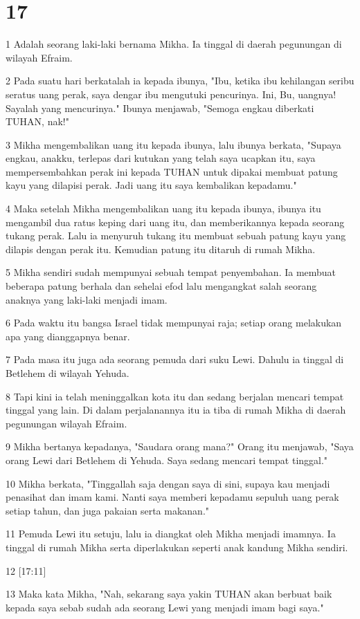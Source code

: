 \chapter{17}

\par 1 Adalah seorang laki-laki bernama Mikha. Ia tinggal di daerah pegunungan di wilayah Efraim.
\par 2 Pada suatu hari berkatalah ia kepada ibunya, "Ibu, ketika ibu kehilangan seribu seratus uang perak, saya dengar ibu mengutuki pencurinya. Ini, Bu, uangnya! Sayalah yang mencurinya." Ibunya menjawab, "Semoga engkau diberkati TUHAN, nak!"
\par 3 Mikha mengembalikan uang itu kepada ibunya, lalu ibunya berkata, "Supaya engkau, anakku, terlepas dari kutukan yang telah saya ucapkan itu, saya mempersembahkan perak ini kepada TUHAN untuk dipakai membuat patung kayu yang dilapisi perak. Jadi uang itu saya kembalikan kepadamu."
\par 4 Maka setelah Mikha mengembalikan uang itu kepada ibunya, ibunya itu mengambil dua ratus keping dari uang itu, dan memberikannya kepada seorang tukang perak. Lalu ia menyuruh tukang itu membuat sebuah patung kayu yang dilapis dengan perak itu. Kemudian patung itu ditaruh di rumah Mikha.
\par 5 Mikha sendiri sudah mempunyai sebuah tempat penyembahan. Ia membuat beberapa patung berhala dan sehelai efod lalu mengangkat salah seorang anaknya yang laki-laki menjadi imam.
\par 6 Pada waktu itu bangsa Israel tidak mempunyai raja; setiap orang melakukan apa yang dianggapnya benar.
\par 7 Pada masa itu juga ada seorang pemuda dari suku Lewi. Dahulu ia tinggal di Betlehem di wilayah Yehuda.
\par 8 Tapi kini ia telah meninggalkan kota itu dan sedang berjalan mencari tempat tinggal yang lain. Di dalam perjalanannya itu ia tiba di rumah Mikha di daerah pegunungan wilayah Efraim.
\par 9 Mikha bertanya kepadanya, "Saudara orang mana?" Orang itu menjawab, "Saya orang Lewi dari Betlehem di Yehuda. Saya sedang mencari tempat tinggal."
\par 10 Mikha berkata, "Tinggallah saja dengan saya di sini, supaya kau menjadi penasihat dan imam kami. Nanti saya memberi kepadamu sepuluh uang perak setiap tahun, dan juga pakaian serta makanan."
\par 11 Pemuda Lewi itu setuju, lalu ia diangkat oleh Mikha menjadi imamnya. Ia tinggal di rumah Mikha serta diperlakukan seperti anak kandung Mikha sendiri.
\par 12 [17:11]
\par 13 Maka kata Mikha, "Nah, sekarang saya yakin TUHAN akan berbuat baik kepada saya sebab sudah ada seorang Lewi yang menjadi imam bagi saya."


